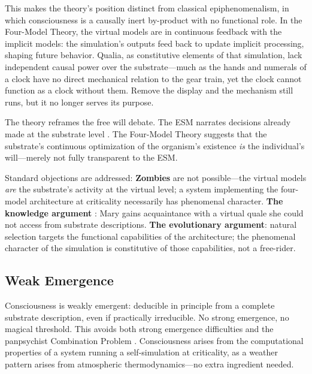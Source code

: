 \documentclass[12pt]{article}
\begin{document}
This makes the theory's position distinct from classical epiphenomenalism, in which consciousness is a causally inert by-product with no functional role. In the Four-Model Theory, the virtual models are in continuous feedback with the implicit models: the simulation's outputs feed back to update implicit processing, shaping future behavior. Qualia, as constitutive elements of that simulation, lack independent causal power over the substrate---\hspace{0pt}much as the hands and numerals of a clock have no direct mechanical relation to the gear train, yet the clock cannot function as a clock without them. Remove the display and the mechanism still runs, but it no longer serves its purpose.

The theory reframes the free will debate. The ESM narrates decisions already made at the substrate level \citep{Libet1985,Schurger2012,Wegner2002}. The Four-Model Theory suggests that the substrate's continuous optimization of the organism's existence \emph{is} the individual's will---\hspace{0pt}merely not fully transparent to the ESM.

Standard objections are addressed: \textbf{Zombies} \citep{Chalmers1996} are not possible---\hspace{0pt}the virtual models \emph{are} the substrate's activity at the virtual level; a system implementing the four-model architecture at criticality necessarily has phenomenal character. \textbf{The knowledge argument} \citep{Jackson1982}: Mary gains acquaintance with a virtual quale she could not access from substrate descriptions. \textbf{The evolutionary argument}: natural selection targets the functional capabilities of the architecture; the phenomenal character of the simulation is constitutive of those capabilities, not a free-rider.


\subsection{Weak Emergence}

Consciousness is weakly emergent: deducible in principle from a complete substrate description, even if practically irreducible. No strong emergence, no magical threshold. This avoids both strong emergence difficulties \citep{Kim1993} and the panpsychist Combination Problem \citep{Chalmers2016}. Consciousness arises from the computational properties of a system running a self-simulation at criticality, as a weather pattern arises from atmospheric thermodynamics---\hspace{0pt}no extra ingredient needed.
\end{document}
